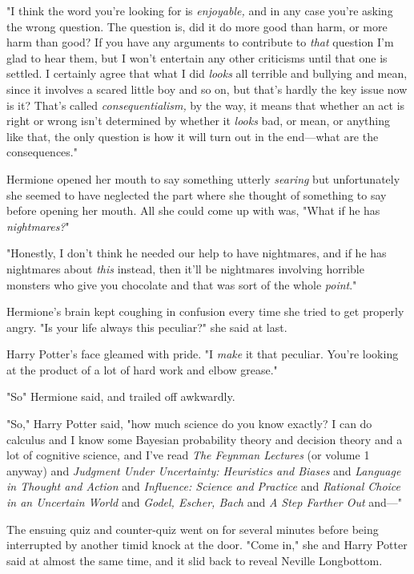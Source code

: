 "I think the word you're looking for is \emph{enjoyable,} and in any case
you're asking the wrong question. The question is, did it do more good than
harm, or more harm than good? If you have any arguments to contribute to
\emph{that} question I'm glad to hear them, but I won't entertain any other
criticisms until that one is settled. I certainly agree that what I did
\emph{looks} all terrible and bullying and mean, since it involves a scared
little boy and so on, but that's hardly the key issue now is it? That's called
\emph{consequentialism,} by the way, it means that whether an act is right or
wrong isn't determined by whether it \emph{looks} bad, or mean, or anything
like that, the only question is how it will turn out in the end---what are the
consequences."

Hermione opened her mouth to say something utterly \emph{searing} but
unfortunately she seemed to have neglected the part where she thought of
something to say before opening her mouth. All she could come up with was,
"What if he has \emph{nightmares?}"

"Honestly, I don't think he needed our help to have nightmares, and if he has
nightmares about \emph{this} instead, then it'll be nightmares involving
horrible monsters who give you chocolate and that was sort of the whole
\emph{point}."

Hermione's brain kept coughing in confusion every time she tried to get
properly angry. "Is your life always this peculiar?" she said at last.

Harry Potter's face gleamed with pride. "I \emph{make} it that peculiar. You're
looking at the product of a lot of hard work and elbow grease."

"So{\el}" Hermione said, and trailed off awkwardly.

"So," Harry Potter said, "how much science do you know exactly? I can do
calculus and I know some Bayesian probability theory and decision theory and a
lot of cognitive science, and I've read \emph{The Feynman Lectures} (or volume
1 anyway) and \emph{Judgment Under Uncertainty: Heuristics and Biases} and
\emph{Language in Thought and Action} and \emph{Influence: Science and
Practice} and \emph{Rational Choice in an Uncertain World} and \emph{Godel,
Escher, Bach} and \emph{A Step Farther Out} and\mbox{---}"

The ensuing quiz and counter-quiz went on for several minutes before being
interrupted by another timid knock at the door. "Come in," she and Harry Potter
said at almost the same time, and it slid back to reveal Neville Longbottom.

